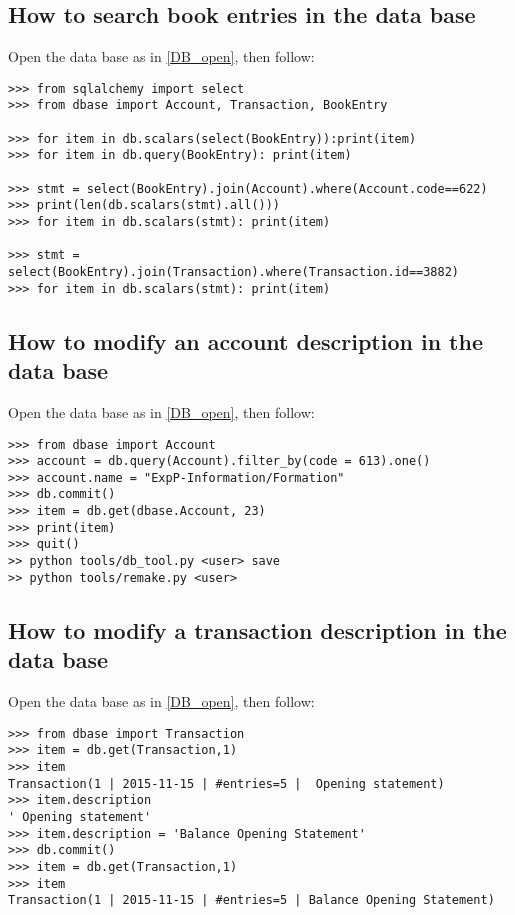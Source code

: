 \documentclass[12pt, a4paper]{article}
\begin{document}
\subsection{How to search  book entries in the data base} \label{DB_book_entries}
Open the data base as in \ref{DB_open}, then follow:
\begin{verbatim}
>>> from sqlalchemy import select
>>> from dbase import Account, Transaction, BookEntry

>>> for item in db.scalars(select(BookEntry)):print(item)
>>> for item in db.query(BookEntry): print(item)

>>> stmt = select(BookEntry).join(Account).where(Account.code==622)
>>> print(len(db.scalars(stmt).all()))
>>> for item in db.scalars(stmt): print(item)

>>> stmt = select(BookEntry).join(Transaction).where(Transaction.id==3882)
>>> for item in db.scalars(stmt): print(item)

\end{verbatim}

\subsection{How to modify an account description in the data base} \label{DB_account_description}
Open the data base as in \ref{DB_open}, then follow:
\begin{verbatim}
>>> from dbase import Account
>>> account = db.query(Account).filter_by(code = 613).one()
>>> account.name = "ExpP-Information/Formation"
>>> db.commit()
>>> item = db.get(dbase.Account, 23)
>>> print(item)
>>> quit()
>> python tools/db_tool.py <user> save 
>> python tools/remake.py <user>
\end{verbatim}

\subsection{How to modify a transaction description in the data base}
Open the data base as in \ref{DB_open}, then follow:
\begin{verbatim}
>>> from dbase import Transaction
>>> item = db.get(Transaction,1)
>>> item
Transaction(1 | 2015-11-15 | #entries=5 |  Opening statement)
>>> item.description
' Opening statement'
>>> item.description = 'Balance Opening Statement'
>>> db.commit()
>>> item = db.get(Transaction,1)
>>> item
Transaction(1 | 2015-11-15 | #entries=5 | Balance Opening Statement)
\end{verbatim}
 
\end{document}
